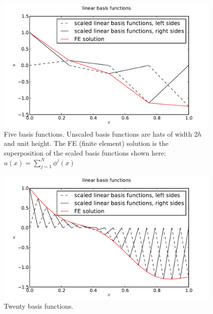 \documentclass[10pt]{article}
\begin{document}
\begin{figure}[ht]
    \centering
    \includegraphics[width=\columnwidth,keepaspectratio=true]{./hw7-basis_functions-N5.pdf}
    \caption{Five basis functions. Unscaled basis functions are hats of width $2h$ and unit height. The FE (finite element) solution is the superposition of the scaled basis functions shown here: $u(x)= \sum_{j=1}^{N}{\phi^j(x)}$}
    \label{fig:N5}
\end{figure}

\begin{figure}[ht]
    \centering
    \includegraphics[width=\columnwidth,keepaspectratio=true]{./hw7-basis_functions-N20.pdf}
    \caption{Twenty basis functions.}
    \label{fig:N20}
\end{figure}
\end{document}
